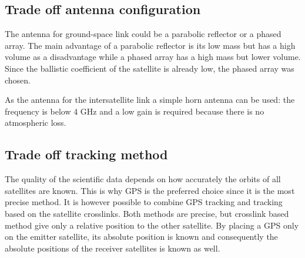 \subsection{Trade off antenna configuration}
The antenna for ground-space link could be a parabolic reflector or a phased array. The main advantage of a parabolic reflector is its low mass but has a high volume as a disadvantage while a phased array has a high mass but lower volume. Since the ballistic coefficient of the satellite is already low, the phased array was chosen.

As the antenna for the intersatellite link a simple horn antenna can be used: the frequency is below 4 GHz and a low gain is required because there is no atmospheric loss.

\subsection{Trade off tracking method}
\label{TOcommTA}
The quality of the scientific data depends on how accurately the orbits of all satellites are known. This is why GPS is the preferred choice since it is the most precise method. It is however possible to combine GPS tracking and tracking based on the satellite crosslinks. Both methods are precise, but crosslink based method give only a relative position to the other satellite. By placing a GPS only on the emitter satellite, its absolute position is known and consequently the absolute positions of the receiver satellites is known as well.
